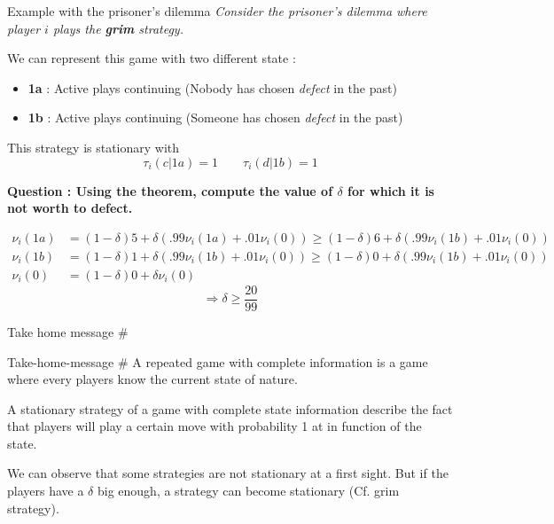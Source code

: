 \begin{frame}{Example with the prisoner's dilemma}
\textit{Consider the prisoner's dilemma where player $i$ plays the \textbf{grim} strategy.}

\pause
We can represent this game with two different state : 
\begin{itemize}
	\item \textbf{1a} : Active plays continuing (Nobody has chosen \textit{defect} in the past)
	\item \textbf{1b} : Active plays continuing (Someone has chosen \textit{defect} in the past)
\end{itemize}

\pause
This strategy is stationary with
$$ \tau_i(c|1a) = 1 \qquad \tau_i(d|1b) = 1$$

\pause
\textbf{Question : Using the theorem, compute the value of $\delta$ for which it is not worth to defect.}
\pause

\begin{small}
\begin{align*}
	\nu_i(1a) &= (1-\delta)5 + \delta ( .99 \nu_i(1a) + .01 \nu_i(0) ) \geq (1-\delta)6 + \delta ( .99 \nu_i(1b) + .01 \nu_i(0) ) \\
	\nu_i(1b) &= (1-\delta)1 + \delta ( .99 \nu_i(1b) + .01 \nu_i(0) ) \geq (1-\delta)0 + \delta ( .99 \nu_i(1b) + .01 \nu_i(0) )	\\
	\nu_i(0) &= (1-\delta) 0 + \delta \nu_i(0)
\end{align*}
$$ \Rightarrow \delta \geq \frac{20}{99} $$
\end{small}

\end{frame}

\begin{frame}{Take home message \#}
    \begin{block}{Take-home-message \#}
        A {\color{green}repeated game with complete information} is a game where every players know the current state of nature.
        
        A {\color{green}stationary strategy} of a game with complete state information describe the fact that players will play a certain move with probability 1 at in function of the state.
        
        We can observe that some strategies are not stationary at a first sight. But if the players have a $\delta$ big enough, a strategy can become stationary (Cf. grim strategy).
    \end{block}

\end{frame}
